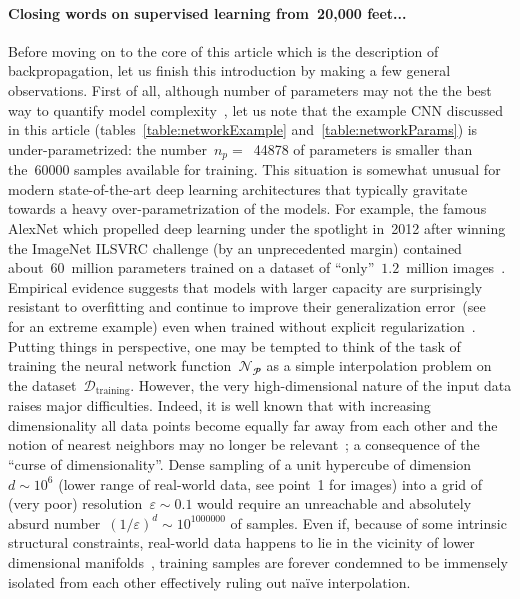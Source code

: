 \documentclass{article}
\begin{document}
\paragraph{Closing words on supervised learning from~20,000 feet...}  Before moving on to the core of this article which is the description of backpropagation, let us finish this introduction by making a few general observations.  First of all, although number of parameters may not the the best way to quantify model complexity~\cite{intrinsicDim,oneParam}, let us note that the example CNN discussed in this article (tables~\ref{table:networkExample} and~\ref{table:networkParams}) is under-parametrized: the number~$n_p=$~\num[group-separator={,}]{44878} of parameters is smaller than the~\num[group-separator={,}]{60000} samples available for training.  This situation is somewhat unusual for modern state-of-the-art deep learning architectures that typically gravitate towards a heavy over-parametrization of the models.  For example, the famous AlexNet which propelled deep learning under the spotlight in~2012 after winning the ImageNet ILSVRC challenge (by an unprecedented margin) contained about~60~million parameters trained on a dataset of ``only''~$1.2$~million images~\cite{imageNet}.  Empirical evidence suggests that models with larger capacity are surprisingly resistant to overfitting and continue to improve their generalization error~(see~\cite{outrageousLarge} for an extreme example) even when trained without explicit regularization~\cite{overParam}. \\

\noindent Putting things in perspective, one may be tempted to think of the task of training the neural network function~$\mathcal{N}_\mathbfcal{P}$ as a simple interpolation problem on the dataset~$\mathcal{D}_\text{training}$.  However, the very high-dimensional nature of the input data raises major difficulties.  Indeed, it is well known that with increasing dimensionality all data points become equally far away from each other and the notion of nearest neighbors may no longer be relevant~\cite{distanceRatioHighD}; a consequence of the ``curse of dimensionality''.  Dense sampling of a unit hypercube of dimension~$d \sim 10^6$ (lower range of real-world data, see point~1 for images) into a grid of (very poor) resolution~$\varepsilon \sim 0.1$ would require an unreachable and absolutely absurd number~$(1/\varepsilon)^d \sim 10^{\num[group-separator={,}]{1000000}}$ of samples.  Even if, because of some intrinsic structural constraints, real-world data happens to lie in the vicinity of lower dimensional manifolds~\cite{dimReduction}, training samples are forever condemned to be immensely isolated from each other effectively ruling out na\"ive interpolation.
\end{document}
